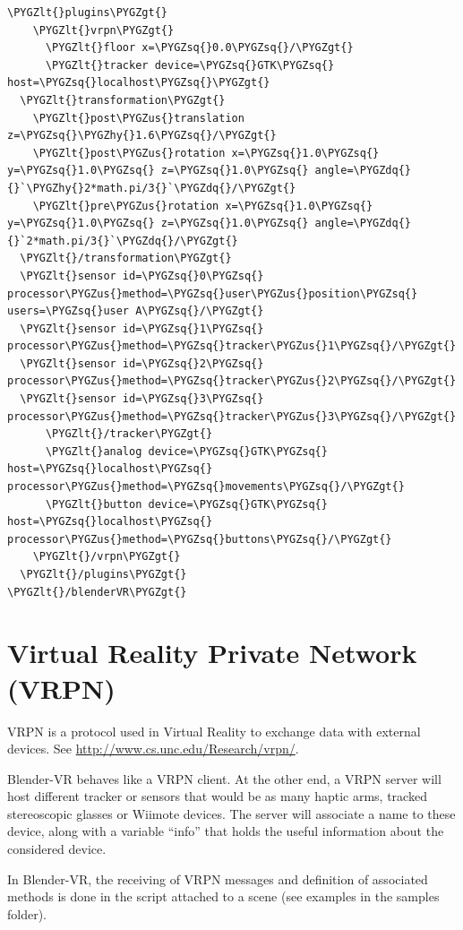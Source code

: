 \documentclass[a4,10pt,openany,oneside]{sphinxmanual}
\def\PYGZus{\char`\_}
\def\PYGZlt{\char`\<}
\def\PYGZgt{\char`\>}
\def\PYGZhy{\char`\-}
\def\PYGZsq{\char`\'}
\def\PYGZdq{\char`\"}
\begin{document}
\begin{Verbatim}[commandchars=\\\{\}]
  \PYGZlt{}plugins\PYGZgt{}
    \PYGZlt{}vrpn\PYGZgt{}
      \PYGZlt{}floor x=\PYGZsq{}0.0\PYGZsq{}/\PYGZgt{}
      \PYGZlt{}tracker device=\PYGZsq{}GTK\PYGZsq{} host=\PYGZsq{}localhost\PYGZsq{}\PYGZgt{}
  \PYGZlt{}transformation\PYGZgt{}
    \PYGZlt{}post\PYGZus{}translation z=\PYGZsq{}\PYGZhy{}1.6\PYGZsq{}/\PYGZgt{}
    \PYGZlt{}post\PYGZus{}rotation x=\PYGZsq{}1.0\PYGZsq{} y=\PYGZsq{}1.0\PYGZsq{} z=\PYGZsq{}1.0\PYGZsq{} angle=\PYGZdq{}{}`\PYGZhy{}2*math.pi/3{}`\PYGZdq{}/\PYGZgt{}
    \PYGZlt{}pre\PYGZus{}rotation x=\PYGZsq{}1.0\PYGZsq{} y=\PYGZsq{}1.0\PYGZsq{} z=\PYGZsq{}1.0\PYGZsq{} angle=\PYGZdq{}{}`2*math.pi/3{}`\PYGZdq{}/\PYGZgt{}
  \PYGZlt{}/transformation\PYGZgt{}
  \PYGZlt{}sensor id=\PYGZsq{}0\PYGZsq{} processor\PYGZus{}method=\PYGZsq{}user\PYGZus{}position\PYGZsq{} users=\PYGZsq{}user A\PYGZsq{}/\PYGZgt{}
  \PYGZlt{}sensor id=\PYGZsq{}1\PYGZsq{} processor\PYGZus{}method=\PYGZsq{}tracker\PYGZus{}1\PYGZsq{}/\PYGZgt{}
  \PYGZlt{}sensor id=\PYGZsq{}2\PYGZsq{} processor\PYGZus{}method=\PYGZsq{}tracker\PYGZus{}2\PYGZsq{}/\PYGZgt{}
  \PYGZlt{}sensor id=\PYGZsq{}3\PYGZsq{} processor\PYGZus{}method=\PYGZsq{}tracker\PYGZus{}3\PYGZsq{}/\PYGZgt{}
      \PYGZlt{}/tracker\PYGZgt{}
      \PYGZlt{}analog device=\PYGZsq{}GTK\PYGZsq{} host=\PYGZsq{}localhost\PYGZsq{} processor\PYGZus{}method=\PYGZsq{}movements\PYGZsq{}/\PYGZgt{}
      \PYGZlt{}button device=\PYGZsq{}GTK\PYGZsq{} host=\PYGZsq{}localhost\PYGZsq{} processor\PYGZus{}method=\PYGZsq{}buttons\PYGZsq{}/\PYGZgt{}
    \PYGZlt{}/vrpn\PYGZgt{}
  \PYGZlt{}/plugins\PYGZgt{}
\PYGZlt{}/blenderVR\PYGZgt{}
\end{Verbatim}


\section{Virtual Reality Private Network (VRPN)}
\label{components/vrpn:virtual-reality-private-network-vrpn}\label{components/vrpn::doc}
VRPN is a protocol used in Virtual Reality to exchange data with external devices. See \href{http://www.cs.unc.edu/Research/vrpn/}{http://www.cs.unc.edu/Research/vrpn/}.

Blender-VR behaves like a VRPN client. At the other end, a VRPN server will host
different tracker or sensors that would be as many haptic arms, tracked stereoscopic
glasses or Wiimote devices. The server will associate a name to these device, along
with a variable “info” that holds the useful information about
the considered device.

In Blender-VR, the receiving of VRPN messages and definition of associated methods
is done in the  script attached to a scene (see
examples in the samples folder).
\end{document}
